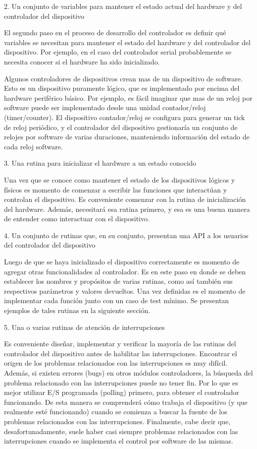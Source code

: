 \documentclass[12pt]{article}
\begin{document}
2. Un conjunto de variables para mantener el estado actual del hardware
y del controlador del dispositivo

El segundo paso en el proceso de desarrollo del controlador es definir
qué variables se necesitan para mantener el estado del hardware y 
del controlador del dispositivo. Por ejemplo, en el caso del controlador 
serial probablemente se necesita conocer si el
hardware ha sido inicializado.

Algunos controladores de dispositivos crean mas de un dispositivo de software.
Esto es un dispositivo puramente lógico, que es implementado por encima
del hardware periférico básico. Por ejemplo, es fácil imaginar
que mas de un reloj por software puede ser implementado desde una
unidad contador/reloj (timer/counter). El dispositivo contador/reloj se configura
para generar un tick de reloj periódico, y el controlador del dispositivo
gestionaría un conjunto de relojes por software de varias duraciones,
manteniendo información del estado de cada reloj software.

3. Una rutina para inicializar el hardware a un estado conocido

Una vez que se conoce como mantener el estado de los dispositivos 
lógicos y físicos es momento de comenzar a escribir las funciones que 
interactúan y controlan el dispositivo. Es conveniente comenzar 
con la rutina de inicialización del hardware. Además, necesitará
esa rutina primero, y esa es una buena manera de entender como interactuar
con el dispositivo.

4. Un conjunto de rutinas que, en su conjunto, presentan una API 
a los usuarios del controlador del dispositivo

Luego de que se haya inicializado el dispositivo correctamente es
momento de agregar otras funcionalidades al controlador. Es en este
paso en donde se deben establecer los nombres y propósitos de varias 
rutinas, como así también sus respectivos parámetros y valores devueltos.
Una vez definidas es el momento de implementar cada función junto
con un caso de test mínimo. Se presentan ejemplos de tales rutinas
en la siguiente sección.

5. Una o varias rutinas de atención de interrupciones

Es conveniente diseñar, implementar y verificar la mayoría de las rutinas
del controlador del dispositivo antes de habilitar las interrupciones.
Encontrar el origen de los problemas relacionados con las interrupciones
es muy difícil. Además, si existen errores (bugs) en otros módulos
controladores, la búsqueda del problema relacionado con las interrupciones
puede no tener fin. Por lo que es mejor utilizar 
E/S programada (polling) primero, para obtener el controlador funcionando.
De esta manera se comprenderá cómo trabaja el dispositivo (y que 
realmente esté funcionando) cuando se comienza a buscar la fuente
de los problemas relacionados con las interrupciones. Finalmente, cabe
decir que, desafortunadamente, suele haber casi siempre problemas 
relacionados con las interrupciones cuando se implementa el control por 
software de las mismas.
\end{document}
